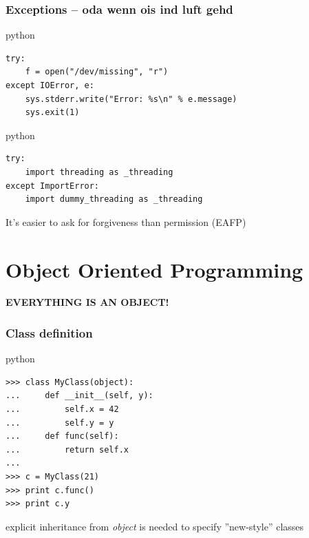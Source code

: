 \documentclass{beamer}
\begin{document}
\begin{frame}[fragile]
	\frametitle{Exceptions -- oda wenn ois ind luft gehd}
	\begin{exampleblock}{python}
	\begin{lstlisting}
try:
    f = open("/dev/missing", "r")
except IOError, e:
    sys.stderr.write("Error: %s\n" % e.message)
    sys.exit(1)
	\end{lstlisting}
	\end{exampleblock}

\pause

	\begin{exampleblock}{python}
	\begin{lstlisting}
try:
    import threading as _threading
except ImportError:
    import dummy_threading as _threading
	\end{lstlisting}
	\end{exampleblock}
	
	It's easier to ask for forgiveness than permission (EAFP)
\end{frame}

\section{Object Oriented Programming}

\begin{frame}[plain]
	\begin{center}
	\huge{\textbf{EVERYTHING IS AN OBJECT!}}
	\end{center}
\end{frame}

\begin{frame}[fragile]
	\frametitle{Class definition}
	\begin{exampleblock}{python}
	\begin{lstlisting}
>>> class MyClass(object):
...     def __init__(self, y):
...         self.x = 42
...         self.y = y
...     def func(self):
...         return self.x
... 
>>> c = MyClass(21)
>>> print c.func()
>>> print c.y
	\end{lstlisting}
	\end{exampleblock}
	
	explicit inheritance from \emph{object} is needed to specify ''new-style'' classes
\end{frame}
\end{document}
